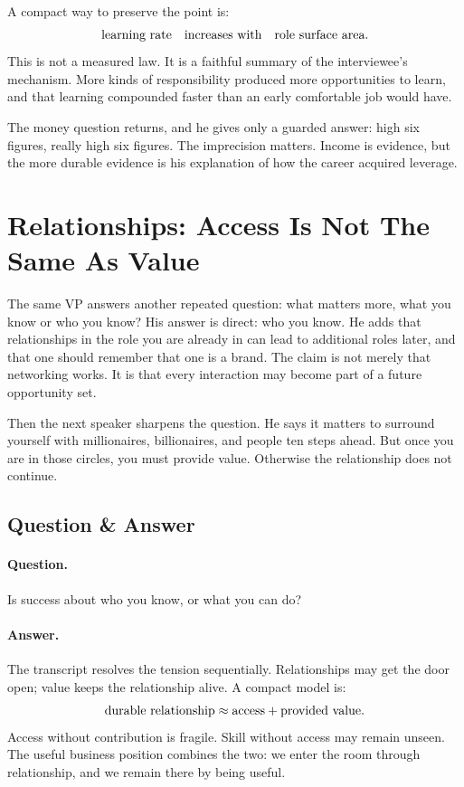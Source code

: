 A compact way to preserve the point is:
\begin{equation}
\hbox{learning rate}
\quad \hbox{increases with} \quad
\hbox{role surface area}.
\end{equation}
This is not a measured law. It is a faithful summary of the interviewee's mechanism. More kinds of responsibility produced more opportunities to learn, and that learning compounded faster than an early comfortable job would have.

The money question returns, and he gives only a guarded answer: high six figures, really high six figures. The imprecision matters. Income is evidence, but the more durable evidence is his explanation of how the career acquired leverage.

\section{Relationships: Access Is Not The Same As Value}

The same VP answers another repeated question: what matters more, what you know or who you know? His answer is direct: who you know. He adds that relationships in the role you are already in can lead to additional roles later, and that one should remember that one is a brand. The claim is not merely that networking works. It is that every interaction may become part of a future opportunity set.

Then the next speaker sharpens the question. He says it matters to surround yourself with millionaires, billionaires, and people ten steps ahead. But once you are in those circles, you must provide value. Otherwise the relationship does not continue.

\subsection{Question \& Answer}

\paragraph{Question.}
Is success about who you know, or what you can do?

\paragraph{Answer.}
The transcript resolves the tension sequentially. Relationships may get the door open; value keeps the relationship alive. A compact model is:
\begin{equation}
\hbox{durable relationship}
\approx
\hbox{access}
+
\hbox{provided value}.
\end{equation}
Access without contribution is fragile. Skill without access may remain unseen. The useful business position combines the two: we enter the room through relationship, and we remain there by being useful.

